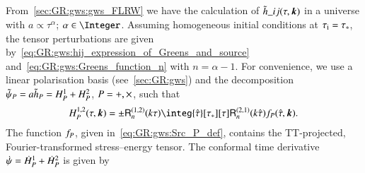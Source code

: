 




\subsection{}
    From~\cref{sec:GR:gws:gws_FLRW} we have the calculation of $\tilde{h}\_{ij}(\tau, \boldsymbol{k})$ in a universe with $a\propto \tau^\alpha$; ${\alpha\in\Integer}$. Assuming homogeneous initial conditions at $\tau_\mathrm{i}=\tau_\ast$, the tensor perturbations are given by~\cref{eq:GR:gws:hij_expression_of_Greens_and_source} and~\cref{eq:GR:gws:Greens_function_n} with $n=\alpha-1$. For convenience, we use a linear polarisation basis (see~\cref{sec:GR:gws}) and the decomposition $\tilde{\psi}_P = a\tilde{h}_P=H^{1}_P + H^2_P $, $P=+, \times$, such that
    \begin{equation}\label{eq:pertwalls:gws:H_P_12}
        H_P^{1,2}(\tau, \vec{k}) = \pm\mathsf{R}^{(1,2)}_n(k\tau) \integ{\dummy{\tau}}[\tau_\ast][\tau]  \mathsf{R}^{(2,1)}_n(k\dummy{\tau})  \Src_P(\dummy{\tau}, \vec{k}).
    \end{equation}
    The function $f_P$, given in~\cref{eq:GR:gws:Src_P_def},
    contains the TT-projected, Fourier-transformed stress--energy tensor. The conformal time derivative $\dot{\psi} = \dot{H}^1_P + \dot{H}^2_P $ is given by
